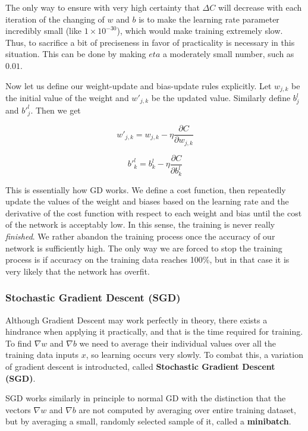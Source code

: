 \documentclass{article}
\begin{document}
The only way to ensure with very high certainty that $\Delta C$ will decrease with each iteration of the changing of $w$ and $b$ is to make the learning rate parameter incredibly small (like $1 \times 10^{-30}$), which would make training extremely slow. Thus, to sacrifice a bit of preciseness in favor of practicality is necessary in this situation. This can be done by making $eta$ a moderately small number, such as $0.01$.

Now let us define our weight-update and bias-update rules explicitly. Let $w_{j, k}$ be the initial value of the weight and $w'_{j, k}$ be the updated value. Similarly define $b^{l}_{j}$ and $b'^{l}_{j}$. Then we get

\large
\begin{equation}
    w'_{j,k} = w_{j,k} - \eta \frac{\partial{C}}{\partial{w_{j,k}}}
\end{equation}

\begin{equation}
    b'^{l}_{k} = b^{l}_{k} - \eta \frac{\partial{C}}{\partial{b^{l}_{k}}}
\end{equation}
\normalsize

This is essentially how GD works. We define a cost function, then repeatedly update the values of the weight and biases based on the learning rate and the derivative of the cost function with respect to each weight and bias until the cost of the network is acceptably low. In this sense, the training is never really \textit{finished}. We rather abandon the training process once the accuracy of our network is sufficiently high. The only way we are forced to stop the training process is if accuracy on the training data reaches 100\%, but in  that case it is very likely that the network has overfit.

\subsubsection{Stochastic Gradient Descent (SGD)}
Although Gradient Descent may work perfectly in theory, there exists a hindrance when applying it practically, and that is the time required for training. To find $\nabla w$ and $\nabla b$ we need to average their individual values over all the training data inputs $x$, so learning occurs very slowly. To combat this, a variation of gradient descent is introducted, called \textbf{Stochastic Gradient Descent (SGD)}.

SGD works similarly in principle to normal GD with the distinction that the vectors $\nabla w$ and $\nabla b$ are not computed by averaging over entire training dataset, but by averaging a small, randomly selected sample of it, called a \textbf{minibatch}.
\end{document}
